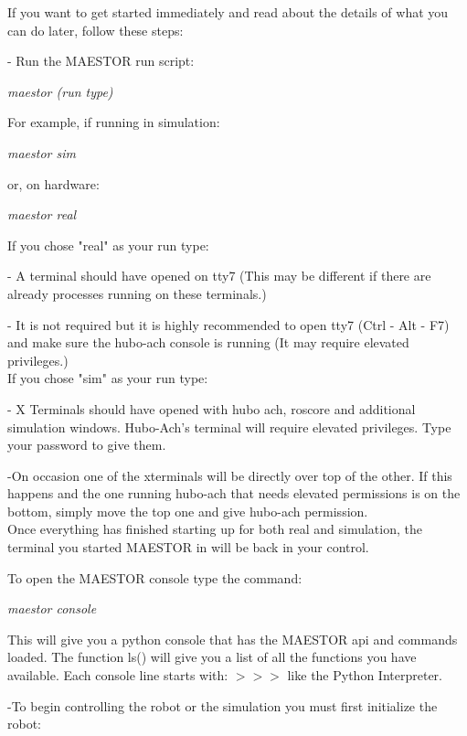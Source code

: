 \documentclass[12pt]{article}
\begin{document}
If you want to get started immediately and read about the details of what you can do later, follow these steps:

	- Run the MAESTOR run script: 
			\begin{center}
				\textit{maestor (run type)}
			\end{center}
		For example, if running in simulation:
            \begin{center}
				\textit{maestor sim}
		    \end{center}
        or, on hardware:
            \begin{center}
				\textit{maestor real}
			\end{center}
		
\noindent If you chose "real" as your run type:
	
		- A terminal should have opened on tty7 (This may be different if there are already processes running on these terminals.)
		
		- It is not required but it is highly recommended to open tty7 (Ctrl - Alt - F7) and make sure the hubo-ach console is running (It may require elevated privileges.)\\

\noindent If you chose "sim" as your run type:
		
		- X Terminals should have opened with hubo ach, roscore and additional simulation windows. Hubo-Ach's terminal will require elevated privileges. Type your password to give them. 
		
		-On occasion one of the xterminals will be directly over top of the other. If this happens and the one running hubo-ach that needs elevated permissions is on the bottom, simply move the top one and give hubo-ach permission. \\
		
\noindent Once everything has finished starting up for both real and simulation, the terminal you started MAESTOR in will be back in your control. 
	
\noindent To open the MAESTOR console type the command:
		\begin{center}
			\textit{maestor console}
		\end{center}

This will give you a python console that has the MAESTOR api and commands loaded. The function ls() will give you a list of all the functions you have available. Each console line starts with: $>>>$ like the Python Interpreter. 

	-To begin controlling the robot or the simulation you must first initialize the robot:
		
\end{document}
